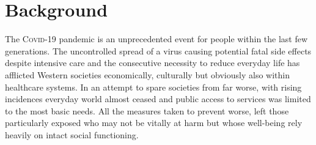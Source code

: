 \documentclass{bmcart}
\begin{document}
\begin{frontmatter}
\begin{abstractbox}
			
			\begin{keyword}				%
			\end{keyword}
			
			
		\end{abstractbox}
		
	\end{frontmatter}
	
	
		

\section*{Background}
	The \textsc{Covid}-19 pandemic is an unprecedented event for people within the last few generations. The uncontrolled spread of a virus causing potential fatal side effects despite intensive care and the consecutive necessity to reduce everyday life has afflicted Western societies economically, culturally but obviously also within healthcare systems. In an attempt to spare societies from far worse, with rising incidences everyday world almost ceased and public access to services was limited to the most basic needs. All the measures taken to prevent worse, left those particularly exposed who may not be vitally at harm but whose well-being rely heavily on intact social functioning.
\end{document}
